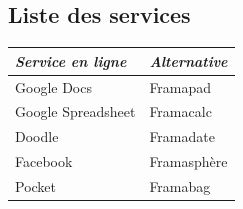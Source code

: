 \documentclass[12pt]{beamer}
\begin{document}
\begin{frame}
		\subsection{Liste des services}
		
		\centering
		\begin{tabular}{|l|l|}
			\hline
			\emph{Service en ligne} & \emph{Alternative} \\
			\hline
			Google Docs & Framapad \\
			\hline
			Google Spreadsheet & Framacalc \\
			\hline
			Doodle & Framadate \\
			\hline
			Facebook & Framasphère \\
			\hline
			Pocket & Framabag \\
			\hline
		\end{tabular}
	\end{frame}
\end{document}
